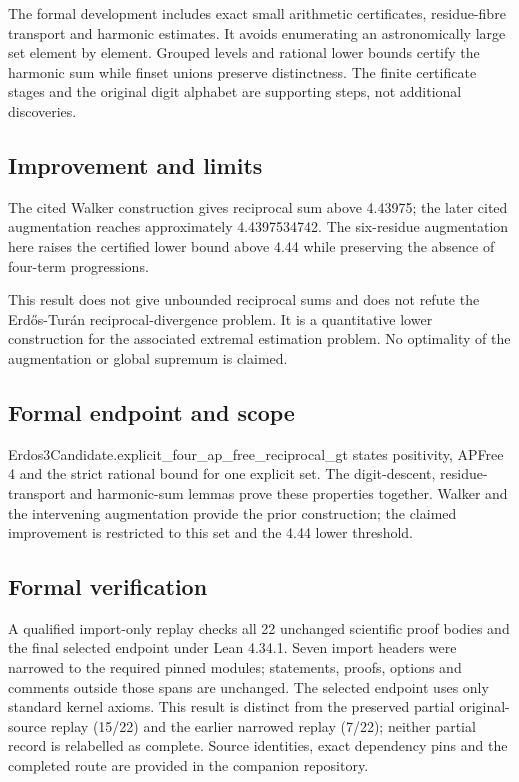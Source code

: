 \documentclass[11pt,a4paper]{article}
\begin{document}
The formal development includes exact small arithmetic certificates, residue-fibre transport and harmonic estimates. It avoids enumerating an astronomically large set element by element. Grouped levels and rational lower bounds certify the harmonic sum while finset unions preserve distinctness. The finite certificate stages and the original digit alphabet are supporting steps, not additional discoveries.

\subsection{Improvement and limits}
The cited Walker construction gives reciprocal sum above 4.43975; the later cited augmentation reaches approximately 4.4397534742. The six-residue augmentation here raises the certified lower bound above 4.44 while preserving the absence of four-term progressions.

This result does not give unbounded reciprocal sums and does not refute the Erdős-Turán reciprocal-divergence problem. It is a quantitative lower construction for the associated extremal estimation problem. No optimality of the augmentation or global supremum is claimed.

\subsection{Formal endpoint and scope}
Erdos3Candidate.explicit\_four\_ap\_free\_reciprocal\_gt states positivity, APFree 4 and the strict rational bound for one explicit set. The digit-descent, residue-transport and harmonic-sum lemmas prove these properties together. Walker and the intervening augmentation provide the prior construction; the claimed improvement is restricted to this set and the 4.44 lower threshold.

\subsection{Formal verification}
A qualified import-only replay checks all 22 unchanged scientific proof bodies and the final selected endpoint under Lean 4.34.1. Seven import headers were narrowed to the required pinned modules; statements, proofs, options and comments outside those spans are unchanged. The selected endpoint uses only standard kernel axioms. This result is distinct from the preserved partial original-source replay (15/22) and the earlier narrowed replay (7/22); neither partial record is relabelled as complete. Source identities, exact dependency pins and the completed route are provided in the companion repository.
\end{document}
